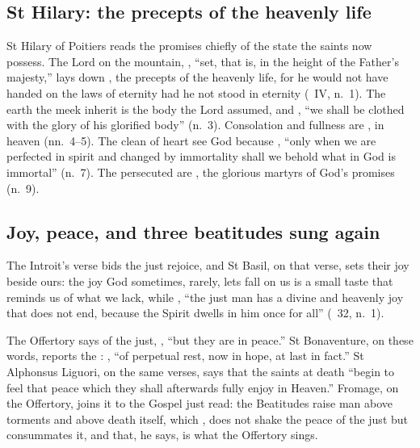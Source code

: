\subsection{St Hilary: the precepts of the heavenly life}
\label{sec:beatitudes-hilary}

St Hilary of Poitiers reads the promises chiefly of the state the saints now
possess. The Lord on the mountain, , ``set, that is, in the height of the Father's majesty,''
lays down , the precepts of the heavenly life,
for he would not have handed on the laws of eternity had he not stood in
eternity (\ IV, n.~1). The earth the meek inherit is the body
the Lord assumed, and ,
``we shall be clothed with the glory of his glorified body'' (n.~3).
Consolation and fullness are , in heaven (nn.~4--5). The clean
of heart see God because , ``only
when we are perfected in spirit and changed by immortality shall we behold what
in God is immortal'' (n.~7). The persecuted are , the glorious martyrs of God's promises (n.~9).

\subsection{Joy, peace, and three beatitudes sung again}
\label{sec:beatitudes-elements}

The Introit's verse bids the just rejoice, and St Basil, on that verse,
sets their joy beside ours: the joy God sometimes, rarely, lets fall on us is
a small taste that reminds us of what we lack, while , ``the
just man has a divine and heavenly joy that does not end, because the Spirit
dwells in him once for all'' (\ 32, n.~1).

The Offertory says of the just, , ``but they are
in peace.'' St Bonaventure, on these words, reports the :
, ``of perpetual rest, now
in hope, at last in fact.'' St Alphonsus Liguori, on the same verses, says that
the saints at death ``begin to feel that peace which they shall afterwards
fully enjoy in Heaven.'' Fromage, on the Offertory, joins it to the Gospel just
read: the Beatitudes raise man above torments and above death itself, which
, does not shake the
peace of the just but consummates it, and that, he says, is what the Offertory
sings.

